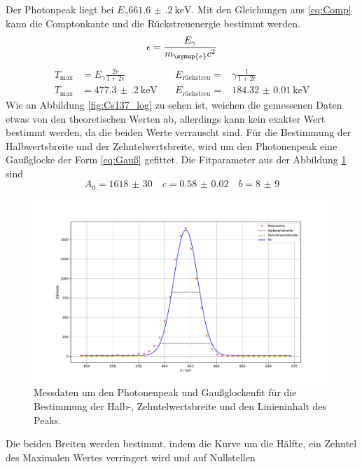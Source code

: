 \FloatBarrier
Der Photonpeak liegt bei $E_{\gamma}\SI{661.6(2)}{\kilo\eV}$. Mit den Gleichungen aus \eqref{eq:Comp} kann 
die Comptonkante und die Rückstreuenergie bestimmt werden.
\begin{equation*}
  \epsilon = \frac{E_{\gamma}}{m_{\symup{e}}c^2}
\end{equation*}
\begin{align}
  T_{\text{max}} &= E_{\gamma}\frac{2\epsilon}{1+2\epsilon} \quad &E_{\text{rückstreu}} =&{\gamma}\frac{1}{1+2\epsilon} \label{eq:Comp}\\
  T_{\text{max}} &= \SI{477.3(2)}{\kilo\eV} \quad &E_{\text{rückstreu}} =& \SI{184.32(1)}{\kilo\eV}
\end{align}
Wie an Abbildung \ref{fig:Cs137_log} zu sehen ist, weichen die gemessenen Daten etwas von den theoretischen Werten ab, allerdings 
kann kein exakter Wert bestimmt werden, da die beiden Werte verrauscht sind.
Für die Bestimmung der Halbwertsbreite und der Zehntelwertsbreite, wird um den Photonenpeak eine Gaußglocke der Form 
\eqref{eq:Gauß} gefittet.
Die Fitparameter aus der Abbildung \ref{fig:02_fit} sind 
\begin{equation*}
  A_0 = \num{1618(30)}\quad c = \num{0.58(2)} \quad b = \num{8(9)}
\end{equation*}
\FloatBarrier
\begin{figure}
  \centering
  \caption{Messdaten um den Photonenpeak und Gaußglockenfit für die Bestimmung der Halb-, Zehntelwertsbreite und den Linieninhalt des Peaks.}
  \label{fig:02_fit}
  \includegraphics[width=\textwidth,keepaspectratio]{figure/02_peak_fit.pdf}
\end{figure}
\FloatBarrier
Die beiden Breiten werden bestimmt, indem die Kurve um die Hälfte, ein Zehntel des Maximalen Wertes verringert wird und auf Nullstellen 
